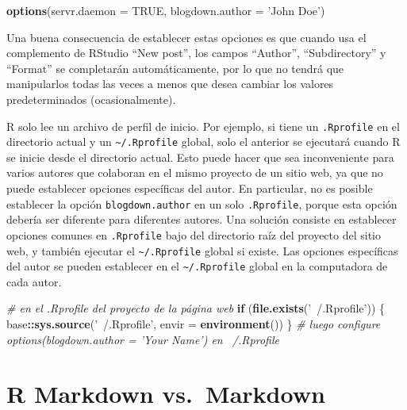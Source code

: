 \documentclass[12pt,]{krantz}
\makeatletter
\newenvironment{Shaded}{\begin{snugshade}}{\end{snugshade}}
\newcommand{\CommentTok}[1]{\textcolor[rgb]{0.56,0.35,0.01}{\textit{#1}}}
\newcommand{\ControlFlowTok}[1]{\textcolor[rgb]{0.13,0.29,0.53}{\textbf{#1}}}
\newcommand{\DataTypeTok}[1]{\textcolor[rgb]{0.13,0.29,0.53}{#1}}
\newcommand{\KeywordTok}[1]{\textcolor[rgb]{0.13,0.29,0.53}{\textbf{#1}}}
\newcommand{\NormalTok}[1]{#1}
\newcommand{\OperatorTok}[1]{\textcolor[rgb]{0.81,0.36,0.00}{\textbf{#1}}}
\newcommand{\OtherTok}[1]{\textcolor[rgb]{0.56,0.35,0.01}{#1}}
\newcommand{\StringTok}[1]{\textcolor[rgb]{0.31,0.60,0.02}{#1}}
\newenvironment{kframe}{%
\medskip{}
\setlength{\fboxsep}{.8em}
 \def\at@end@of@kframe{}%
 \ifinner\ifhmode%
  \def\at@end@of@kframe{\end{minipage}}%
  \begin{minipage}{\columnwidth}%
 \fi\fi%
 \def\FrameCommand##1{\hskip\@totalleftmargin \hskip-\fboxsep
 \colorbox{shadecolor}{##1}\hskip-\fboxsep
     \hskip-\linewidth \hskip-\@totalleftmargin \hskip\columnwidth}%
 \MakeFramed {\advance\hsize-\width
   \@totalleftmargin\z@ \linewidth\hsize
   \@setminipage}}%
 {\par\unskip\endMakeFramed%
 \at@end@of@kframe}
\renewenvironment{Shaded}{\begin{kframe}}{\end{kframe}}
\theoremstyle{definition}
\theoremstyle{definition}
\theoremstyle{definition}
\theoremstyle{remark}
\makeatother
\begin{document}
\begin{Shaded}
\begin{Highlighting}[]
\KeywordTok{options}\NormalTok{(}\DataTypeTok{servr.daemon =} \OtherTok{TRUE}\NormalTok{, }\DataTypeTok{blogdown.author =} \StringTok{'John Doe'}\NormalTok{)}
\end{Highlighting}
\end{Shaded}

Una buena consecuencia de establecer estas opciones es que cuando usa el
complemento de RStudio ``New post'', los campos ``Author'',
``Subdirectory'' y ``Format'' se completarán automáticamente, por lo que
no tendrá que manipularlos todas las veces a menos que desea cambiar los
valores predeterminados (ocasionalmente).

R solo lee un archivo de perfil de inicio. Por ejemplo, si tiene un
\texttt{.Rprofile} en el directorio actual y un
\texttt{\textasciitilde{}/.Rprofile} global, solo el anterior se
ejecutará cuando R se inicie desde el directorio actual. Esto puede
hacer que sea inconveniente para varios autores que colaboran en el
mismo proyecto de un sitio web, ya que no puede establecer opciones
específicas del autor. En particular, no es posible establecer la opción
\texttt{blogdown.author} en un solo \texttt{.Rprofile}, porque esta
opción debería ser diferente para diferentes autores. Una solución
consiste en establecer opciones comunes en \texttt{.Rprofile} bajo del
directorio raíz del proyecto del sitio web, y también ejecutar el
\texttt{\textasciitilde{}/.Rprofile} global si existe. Las opciones
específicas del autor se pueden establecer en el
\texttt{\textasciitilde{}/.Rprofile} global en la computadora de cada
autor.

\begin{Shaded}
\begin{Highlighting}[]
\CommentTok{# en el .Rprofile del proyecto de la página web}
\ControlFlowTok{if}\NormalTok{ (}\KeywordTok{file.exists}\NormalTok{(}\StringTok{'~/.Rprofile'}\NormalTok{)) \{}
\NormalTok{  base}\OperatorTok{::}\KeywordTok{sys.source}\NormalTok{(}\StringTok{'~/.Rprofile'}\NormalTok{, }\DataTypeTok{envir =} \KeywordTok{environment}\NormalTok{())}
\NormalTok{\}}
\CommentTok{# luego configure options(blogdown.author = 'Your Name') en ~/.Rprofile}
\end{Highlighting}
\end{Shaded}

\hypertarget{output-format}{%
\section{R Markdown vs.~Markdown}\label{output-format}}
\end{document}
